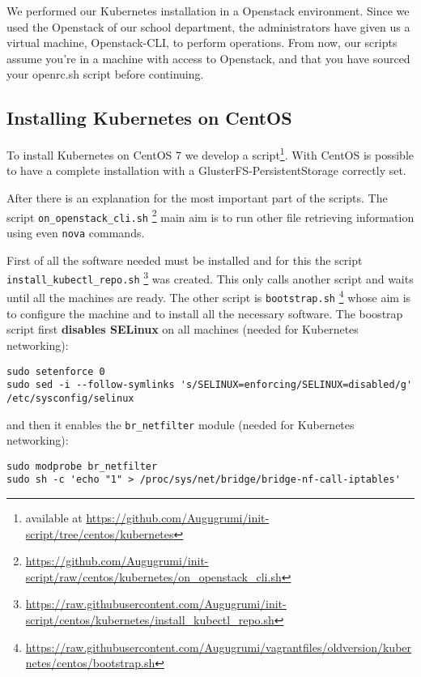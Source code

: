 We performed our Kubernetes installation in a Openstack environment.
Since we used the Openstack of our school department, the administrators have 
given us a virtual machine, Openstack-CLI, to perform operations. From now, our 
scripts assume you're in a machine with access to Openstack, and that you have 
sourced your openrc.sh script before continuing.

\subsection{Installing Kubernetes on CentOS}
\label{installing-kubernetes-on-centos}

To install Kubernetes on CentOS 7 we develop a script\footnote{available
at \url{https://github.com/Augugrumi/init-script/tree/centos/kubernetes}}.
With CentOS is possible to have a complete installation with
a GlusterFS-PersistentStorage correctly set.

After there is an explanation for the most important part of the scripts. The 
script \verb!on_openstack_cli.sh!
\footnote{\url{https://github.com/Augugrumi/init-script/raw/centos/kubernetes/on_openstack_cli.sh}}
main aim is to run other file retrieving information using even \texttt{nova} 
commands.

First of all the software needed must be installed and for this the script 
\\\verb!install_kubectl_repo.sh!
\footnote{\url{https://raw.githubusercontent.com/Augugrumi/init-script/centos/kubernetes/install_kubectl_repo.sh}}
was created. This only calls another script and waits until all the machines
are ready. The other script is \verb!bootstrap.sh!
\footnote{\url{https://raw.githubusercontent.com/Augugrumi/vagrantfiles/oldversion/kubernetes/centos/bootstrap.sh}}
whose aim is to configure the machine and to install all the necessary
software. The boostrap script first \textbf{disables SELinux} on all machines 
(needed for Kubernetes networking):
\begin{lstlisting}
sudo setenforce 0
sudo sed -i --follow-symlinks 's/SELINUX=enforcing/SELINUX=disabled/g' /etc/sysconfig/selinux
\end{lstlisting}

and then it enables the \verb!br_netfilter! module (needed for Kubernetes
networking):
\begin{lstlisting}
sudo modprobe br_netfilter
sudo sh -c 'echo "1" > /proc/sys/net/bridge/bridge-nf-call-iptables'
\end{lstlisting}

